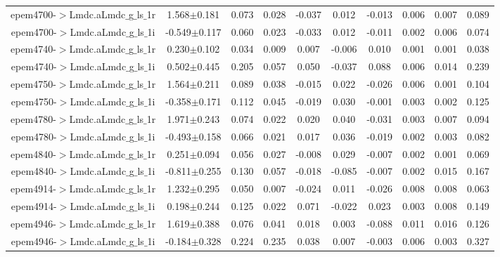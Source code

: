 \begin{table}[H]
{\begin{tabular}{c|c|ccccccc|c}
epem4700-$>$Lmdc.aLmdc$\_$g$\_$ls$\_$1r & 1.568$\pm$0.181 & 0.073 & 0.028 & -0.037 & 0.012 & -0.013 & 0.006 & 0.007 & 0.089\\
epem4700-$>$Lmdc.aLmdc$\_$g$\_$ls$\_$1i & -0.549$\pm$0.117 & 0.060 & 0.023 & -0.033 & 0.012 & -0.011 & 0.002 & 0.006 & 0.074\\
epem4740-$>$Lmdc.aLmdc$\_$g$\_$ls$\_$1r & 0.230$\pm$0.102 & 0.034 & 0.009 & 0.007 & -0.006 & 0.010 & 0.001 & 0.001 & 0.038\\
epem4740-$>$Lmdc.aLmdc$\_$g$\_$ls$\_$1i & 0.502$\pm$0.445 & 0.205 & 0.057 & 0.050 & -0.037 & 0.088 & 0.006 & 0.014 & 0.239\\
epem4750-$>$Lmdc.aLmdc$\_$g$\_$ls$\_$1r & 1.564$\pm$0.211 & 0.089 & 0.038 & -0.015 & 0.022 & -0.026 & 0.006 & 0.001 & 0.104\\
epem4750-$>$Lmdc.aLmdc$\_$g$\_$ls$\_$1i & -0.358$\pm$0.171 & 0.112 & 0.045 & -0.019 & 0.030 & -0.001 & 0.003 & 0.002 & 0.125\\
epem4780-$>$Lmdc.aLmdc$\_$g$\_$ls$\_$1r & 1.971$\pm$0.243 & 0.074 & 0.022 & 0.020 & 0.040 & -0.031 & 0.003 & 0.007 & 0.094\\
epem4780-$>$Lmdc.aLmdc$\_$g$\_$ls$\_$1i & -0.493$\pm$0.158 & 0.066 & 0.021 & 0.017 & 0.036 & -0.019 & 0.002 & 0.003 & 0.082\\
epem4840-$>$Lmdc.aLmdc$\_$g$\_$ls$\_$1r & 0.251$\pm$0.094 & 0.056 & 0.027 & -0.008 & 0.029 & -0.007 & 0.002 & 0.001 & 0.069\\
epem4840-$>$Lmdc.aLmdc$\_$g$\_$ls$\_$1i & -0.811$\pm$0.255 & 0.130 & 0.057 & -0.018 & -0.085 & -0.007 & 0.002 & 0.015 & 0.167\\
epem4914-$>$Lmdc.aLmdc$\_$g$\_$ls$\_$1r & 1.232$\pm$0.295 & 0.050 & 0.007 & -0.024 & 0.011 & -0.026 & 0.008 & 0.008 & 0.063\\
epem4914-$>$Lmdc.aLmdc$\_$g$\_$ls$\_$1i & 0.198$\pm$0.244 & 0.125 & 0.022 & 0.071 & -0.022 & 0.023 & 0.003 & 0.008 & 0.149\\
epem4946-$>$Lmdc.aLmdc$\_$g$\_$ls$\_$1r & 1.619$\pm$0.388 & 0.076 & 0.041 & 0.018 & 0.003 & -0.088 & 0.011 & 0.016 & 0.126\\
epem4946-$>$Lmdc.aLmdc$\_$g$\_$ls$\_$1i & -0.184$\pm$0.328 & 0.224 & 0.235 & 0.038 & 0.007 & -0.003 & 0.006 & 0.003 & 0.327\\
\hline\hline
\end{tabular}
}

\end{table}

